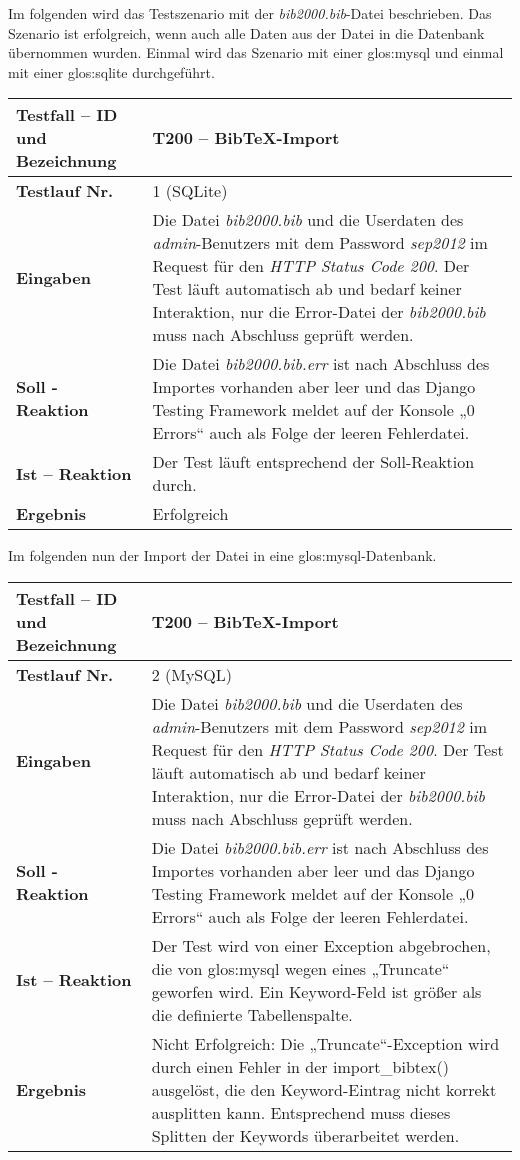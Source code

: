 Im folgenden wird das Testszenario mit der \emph{bib2000.bib}-Datei
beschrieben. Das Szenario ist erfolgreich, wenn auch alle Daten aus der Datei
in die Datenbank übernommen wurden. Einmal wird das Szenario mit einer
\Gls{glos:mysql} und einmal mit einer \Gls{glos:sqlite} durchgeführt.

\begin{longtable}{|p{5cm}|p{10cm}|}
  \hline
  \textbf{Testfall -- ID und Bezeichnung} & T200 -- Bib\TeX -Import \\
  \hline
  \textbf{Testlauf Nr.} & 1 (SQLite) \\
  \hline
  \textbf{Eingaben} &  Die Datei \emph{bib2000.bib} und die Userdaten des
  \emph{admin}-Benutzers mit dem Password \emph{sep2012} im Request für den
  \emph{HTTP Status Code 200}.  Der Test läuft automatisch ab und bedarf keiner
  Interaktion, nur die Error-Datei der \emph{bib2000.bib} muss nach Abschluss
  geprüft werden.\\
  \hline
  \textbf{Soll - Reaktion} & Die Datei \emph{bib2000.bib.err} ist nach
  Abschluss des Importes vorhanden aber leer und das Django Testing Framework
  meldet auf der Konsole „0 Errors“ auch als Folge der leeren Fehlerdatei.
  \\
  \hline
  \textbf{Ist -- Reaktion} & Der Test läuft entsprechend der Soll-Reaktion durch.\\
  \hline
  \textbf{Ergebnis} & Erfolgreich \\
  \hline
\end{longtable}

Im folgenden nun der Import der Datei in eine \Gls{glos:mysql}-Datenbank.
\begin{longtable}{|p{5cm}|p{10cm}|}
  \hline
  \textbf{Testfall -- ID und Bezeichnung} & T200 -- Bib\TeX -Import \\
  \hline
  \textbf{Testlauf Nr.} & 2 (MySQL) \\
  \hline
  \textbf{Eingaben} &  Die Datei \emph{bib2000.bib} und die Userdaten des
  \emph{admin}-Benutzers mit dem Password \emph{sep2012} im Request für den
  \emph{HTTP Status Code 200}.  Der Test läuft automatisch ab und bedarf keiner
  Interaktion, nur die Error-Datei der \emph{bib2000.bib} muss nach Abschluss
  geprüft werden.\\
  \hline
  \textbf{Soll - Reaktion} & Die Datei \emph{bib2000.bib.err} ist nach
  Abschluss des Importes vorhanden aber leer und das Django Testing Framework
  meldet auf der Konsole „0 Errors“ auch als Folge der leeren Fehlerdatei.
  \\
  \hline
  \textbf{Ist -- Reaktion} & Der Test wird von einer Exception abgebrochen, die
  von \Gls{glos:mysql} wegen eines „Truncate“ geworfen wird. Ein Keyword-Feld ist
  größer als die definierte Tabellenspalte.\\
  \hline
  \textbf{Ergebnis} & Nicht Erfolgreich: Die „Truncate“-Exception wird durch
  einen Fehler in der {\sffamily import\_bibtex()} ausgelöst, die den
  Keyword-Eintrag nicht korrekt ausplitten kann. Entsprechend muss dieses
  Splitten der Keywords überarbeitet werden.\\ \hline
\end{longtable}
